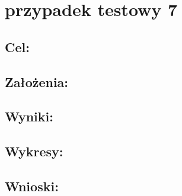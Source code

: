 \section{przypadek testowy 7}
\subsection{Cel: }
\subsection{Założenia: }
\subsection{Wyniki: }
\subsection{Wykresy: }
\subsection{Wnioski: }

